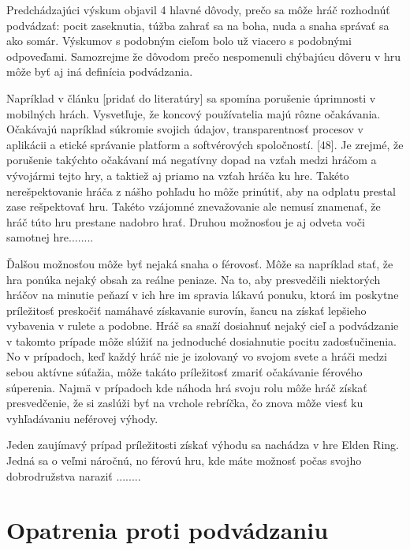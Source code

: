 \documentclass[10pt, oneside, slovak,a4paper]{article}
\begin{document}
Predchádzajúci výskum objavil 4 hlavné dôvody, prečo sa môže hráč rozhodnúť podvádzať: pocit zaseknutia, túžba zahrať sa na boha, nuda a snaha správať sa ako somár.\cite{mood} Výskumov s podobným cieľom bolo už viacero s podobnými odpoveďami. Samozrejme že dôvodom prečo nespomenuli chýbajúcu dôveru v hru môže byť aj iná definícia podvádzania.

Napríklad v článku [pridať do literatúry] sa spomína porušenie úprimnosti v mobilných hrách. Vysvetľuje, že koncový používatelia majú rôzne očakávania. Očakávajú napríklad súkromie svojich údajov, transparentnosť procesov v aplikácii a etické správanie platform a softvérových spoločností. [48]. Je zrejmé, že porušenie takýchto očakávaní má negatívny dopad na vzťah medzi hráčom a vývojármi tejto hry, a taktiež aj priamo na vzťah hráča ku hre. Takéto nerešpektovanie hráča z nášho pohľadu ho môže prinútiť, aby na odplatu prestal zase rešpektovať hru. Takéto vzájomné znevažovanie ale nemusí znamenať, že hráč túto hru prestane nadobro hrať. Druhou možnosťou je aj odveta voči samotnej hre........

Ďalšou možnosťou môže byť nejaká snaha o férovosť. Môže sa napríklad stať, že hra ponúka nejaký obsah za reálne peniaze. Na to, aby presvedčili niektorých hráčov na minutie peňazí v ich hre im spravia lákavú ponuku, ktorá im poskytne príležitosť preskočiť namáhavé získavanie surovín, šancu na získať lepšieho vybavenia v rulete a podobne. Hráč sa snaží dosiahnuť nejaký cieľ a podvádzanie v takomto prípade môže slúžiť na jednoduché dosiahnutie pocitu zadosťučinenia. No v prípadoch, keď každý hráč nie je izolovaný vo svojom svete a hráči medzi sebou aktívne súťažia, môže takáto príležitosť zmariť očakávanie férového súperenia. Najmä v prípadoch kde náhoda hrá svoju rolu môže hráč získať presvedčenie, že si zaslúži byť na vrchole rebríčka, čo znova môže viesť ku vyhľadávaniu neférovej výhody.

Jeden zaujímavý prípad príležitosti získať výhodu sa nachádza v hre Elden Ring. Jedná sa o veľmi náročnú, no férovú hru, kde máte možnosť počas svojho dobrodružstva naraziť ........





\section{Opatrenia proti podvádzaniu}
\end{document}
